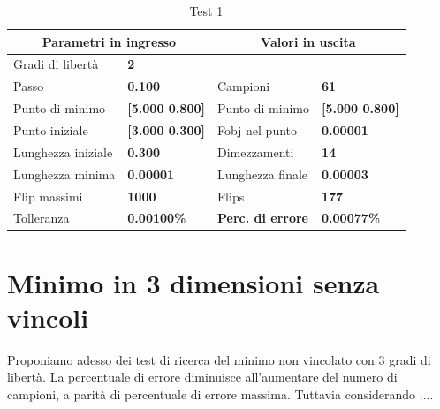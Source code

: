 \documentclass[a4paper, 11pt]{article}
\begin{document}
\begin{table}[h]
\caption{Test 1}
\begin{center}
\begin{tabular}{|l|l|l|l|} 
\hline
\multicolumn{2}{|c|}{\textbf{Parametri in ingresso}} & \multicolumn{2}{c|}{\textbf {Valori in uscita}} \\ \hline
Gradi di libertà  & \textbf{2} &  &  \\ \hline 
Passo & \textbf{0.100} & Campioni & \textbf{61} \\ \hline 
Punto di minimo & \textbf{{[}5.000 0.800{]}} & Punto di minimo & \textbf{{[}5.000 0.800{]}} \\ \hline 
Punto iniziale & \textbf{{[}3.000 0.300{]}} & Fobj nel punto & \textbf{0.00001} \\ \hline 
Lunghezza iniziale & \textbf{0.300} & Dimezzamenti & \textbf{14} \\ \hline 
Lunghezza minima & \textbf{0.00001} & Lunghezza finale & \textbf{0.00003} \\ \hline
Flip massimi & \textbf{1000} & Flips & \textbf{177} \\ \hline 
Tolleranza & \textbf{0.00100\%} & \textbf{Perc. di errore} & \textbf{0.00077\%} \\ \hline 
\end{tabular} 
\end{center}
\end{table}


\section{Minimo in 3 dimensioni senza vincoli}

Proponiamo adesso dei test di ricerca del minimo non vincolato con 3 gradi di
libertà. La percentuale di errore diminuisce all'aumentare del numero di campioni, 
a parità di percentuale di errore massima. Tuttavia considerando .... 
\end{document}
